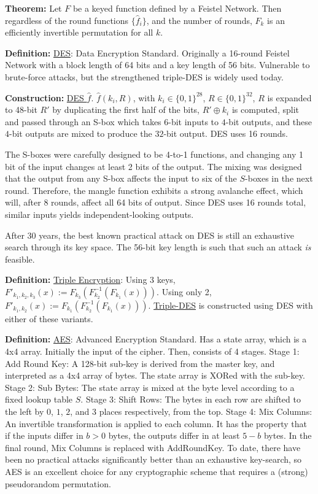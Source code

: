 \documentclass[10pt]{article}
\newcommand{\defn}[1]{{\bf Definition:} \underline{#1}}
\newcommand{\thm}[1]{{\bf Theorem:} \underline{#1}}
\newcommand{\con}[1]{{\bf Construction:} \underline{#1}}
\newcommand{\xor}{\oplus}
\begin{document}
\begin{multicols}{4}
\thm{}Let $F$ be a keyed function defined by a Feistel Network. Then regardless of the round functions $\{\hat{f}_i\}$, and the number of rounds, $F_k$ is an efficiently invertible permutation for all $k$.

\defn{DES}: Data Encryption Standard. Originally a 16-round Feistel Network with a block length of 64 bits and a key length of 56 bits. Vulnerable to brute-force attacks, but the strengthened triple-DES is widely used today.

\con{DES $\hat{f}$}. $\hat{f}(k_i,R)$, with $k_i\in\{0,1\}^{28}$, $R\in\{0,1\}^{32}$, $R$ is expanded to 48-bit $R'$ by duplicating the first half of the bits, $R'\xor k_i$ is computed, split and passed through an S-box which takes $6$-bit inputs to $4$-bit outputs, and these $4$-bit outputs are mixed to produce the $32$-bit output. DES uses 16 rounds.

The S-boxes were carefully designed to be 4-to-1 functions, and changing any 1 bit of the input changes at least 2 bits of the output. The mixing was designed that the output from any S-box affects the input to six of the $S$-boxes in the next round. Therefore, the mangle function exhibits a strong avalanche effect, which will, after 8 rounds, affect all 64 bits of output. Since DES uses 16 rounds total, similar inputs yields independent-looking outputs.

After 30 years, the best known practical attack on DES is still an exhaustive search through its key space. The 56-bit key length is such that such an attack {\it is} feasible.

\defn{Triple Encryption}: Using 3 keys, $F'_{k_1,k_2,k_3}(x):=F_{k_3}(F_{k_2}^{-1}(F_{k_1}(x)))$. Using only 2, $F'_{k_1,k_2}(x):=F_{k_1}(F_{k_2}^{-1}(F_{k_1}(x)))$. \underline{Triple-DES} is constructed using DES with either of these variants.

\defn{AES}: Advanced Encryption Standard. Has a state array, which is a 4x4 array. Initially the input of the cipher. Then, consists of 4 stages. Stage 1: Add Round Key: A 128-bit sub-key is derived from the master key, and interpreted as a 4x4 array of bytes. The state array is XORed with the sub-key. Stage 2: Sub Bytes: The state array is mixed at the byte level according to a fixed lookup table $S$. Stage 3: Shift Rows: The bytes in each row are shifted to the left by $0$, $1$, $2$, and $3$ places respectively, from the top. Stage 4: Mix Columns: An invertible transformation is applied to each column. It has the property that if the inputs differ in $b>0$ bytes, the outputs differ in at least $5-b$ bytes. In the final round, Mix Columns is replaced with AddRoundKey. To date, there have been no practical attacks significantly better than an exhaustive key-search, so AES is an excellent choice for any cryptographic scheme that requires a (strong) pseudorandom permutation.


\end{multicols}
\end{document}
